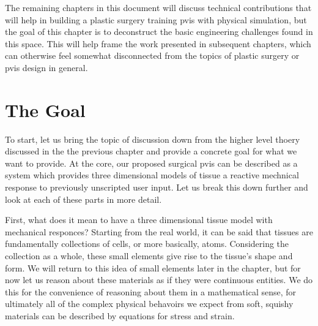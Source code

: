 \documentclass[12pt,oneside,letterpaper]{memoir}
\begin{document}
The remaining chapters in this document will discuss technical
contributions that will help in building a plastic surgery training
\gls{pvis} with physical simulation, but the goal of this chapter is
to deconstruct the basic engineering challenges found in this
space. This will help frame the work presented in subsequent chapters,
which can otherwise feel somewhat disconnected from the topics of
plastic surgery or \gls{pvis} design in general.





\section{The Goal}

To start, let us bring the topic of discussion down from the higher
level thoery discussed in the the previous chapter and provide a
concrete goal for what we want to provide. At the core, our proposed
surgical \gls{pvis} can be described as a system which provides three
dimensional models of tissue a reactive mechnical response to previously
unscripted user input. Let us break this down further and look at each
of these parts in more detail. 

First, what does it mean to have a three dimensional tissue model with
mechanical responces?  Starting from the real world, it can be said
that tissues are fundamentally collections of cells, or more
basically, atoms. Considering the collection as a whole, these small
elements give rise to the tissue's shape and form. We will return to
this idea of small elements later in the chapter, but for now let us
reason about these materials as if they were continuous entities. We
do this for the convenience of reasoning about them in a mathematical
sense, for ultimately all of the complex physical behavoirs we expect
from soft, squishy materials can be described by equations for stress
and strain.
\end{document}
